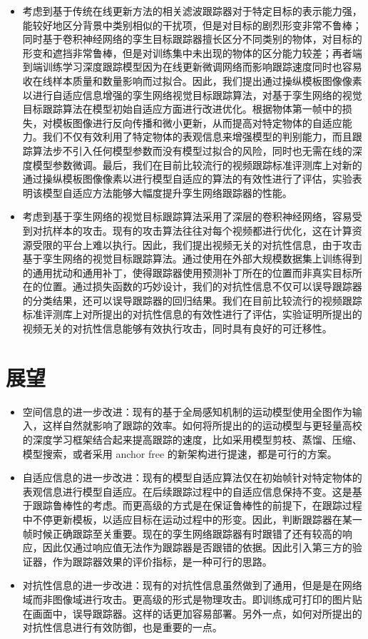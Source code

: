 \begin{itemize}
\item 考虑到基于传统在线更新方法的相关滤波跟踪器对于特定目标的表示能力强，能较好地区分背景中类别相似的干扰项，但是对目标的剧烈形变非常不鲁棒；同时基于卷积神经网络的孪生目标跟踪器擅长区分不同类别的物体，对目标的形变和遮挡非常鲁棒，但是对训练集中未出现的物体的区分能力较差；再者端到端训练学习深度跟踪模型因为在线更新微调网络而影响跟踪速度同时也容易收在线样本质量和数量影响而过拟合。因此，我们提出通过操纵模板图像像素以进行自适应信息增强的孪生网络视觉目标跟踪算法，对基于孪生网络的视觉目标跟踪算法在模型初始自适应方面进行改进优化。根据物体第一帧中的损失，对模板图像进行反向传播和微小更新，从而提高对特定物体的自适应能力。我们不仅有效利用了特定物体的表观信息来增强模型的判别能力，而且跟踪算法步不引入任何模型参数而没有模型过拟合的风险，同时也无需在线的深度模型参数微调。最后，我们在目前比较流行的视频跟踪标准评测库上对新的通过操纵模板图像像素以进行模型自适应的算法的有效性进行了评估，实验表明该模型自适应方法能够大幅度提升孪生网络跟踪器的性能。
\item 考虑到基于孪生网络的视觉目标跟踪算法采用了深层的卷积神经网络，容易受到对抗样本的攻击。现有的攻击算法往往对每个视频都进行优化，这在计算资源受限的平台上难以执行。因此，我们提出视频无关的对抗性信息，由于攻击基于孪生网络的视觉目标跟踪算法。通过使用在外部大规模数据集上训练得到的通用扰动和通用补丁，使得跟踪器使用预测补丁所在的位置而非真实目标所在的位置。通过损失函数的巧妙设计，我们的对抗性信息不仅可以误导跟踪器的分类结果，还可以误导跟踪器的回归结果。我们在目前比较流行的视频跟踪标准评测库上对所提出的对抗性信息的有效性进行了评估，实验证明所提出的视频无关的对抗性信息能够有效执行攻击，同时具有良好的可迁移性。
\end{itemize}
\section{展望}
\begin{itemize}
\item 空间信息的进一步改进：现有的基于全局感知机制的运动模型使用全图作为输入，这样自然就影响了跟踪的效率。如何将所提出的的运动模型与更轻量高校的深度学习框架结合起来提高跟踪的速度，比如采用模型剪枝、蒸馏、压缩、模型搜索，或者采用 anchor free 的新架构进行提速，都是可行的方案。
\item 自适应信息的进一步改进：现有的模型自适应算法仅在初始帧针对特定物体的表观信息进行模型自适应。在后续跟踪过程中的自适应信息保持不变。这是基于跟踪鲁棒性的考虑。而更高级的方式是在保证鲁棒性的前提下，在跟踪过程中不停更新模板，以适应目标在运动过程中的形变。因此，判断跟踪器在某一帧时候正确跟踪至关重要。现在的孪生网络跟踪器有时跟错了还有较高的响应，因此仅通过响应值无法作为跟踪器是否跟错的依据。因此引入第三方的验证器，作为跟踪器效果的评价指标，是一种可行的思路。
\item 对抗性信息的进一步改进：现有的对抗性信息虽然做到了通用，但是是在网络域而非图像域进行攻击。更高级的形式是物理攻击。即训练成可打印的图片贴在画面中，误导跟踪器。这样的话更加容易部署。另外一点，如何对所提出的对抗性信息进行有效防御，也是重要的一点。
\end{itemize}
